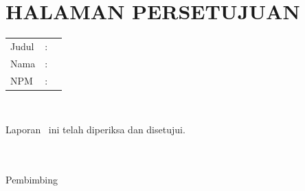 %
%
%

\chapter*{\normalsize HALAMAN PERSETUJUAN}

\vspace*{0.2cm}

\noindent
\begin{tabular}{l l p{11cm}}
	Judul&: & \judul \\
	Nama&: & \penulis \\
	NPM&: & \npm \\
\end{tabular} \\

\vspace*{1.2cm}

\noindent Laporan \type~ini telah diperiksa dan disetujui.\\[0.3cm]
\begin{center}
\tanggalPengesahan \\[2cm]


\underline{\pembimbinga}\\[0.1cm]
Pembimbing \type
\end{center}

\newpage 